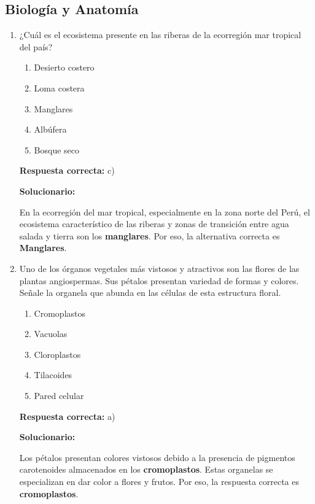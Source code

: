\subsection*{Biología y Anatomía}

\begin{enumerate}[resume]
	
	\item ¿Cuál es el ecosistema presente en las riberas de la ecorregión mar tropical del país?
	\begin{enumerate}[label=\alph*)]
		\item Desierto costero
		\item Loma costera
		\item Manglares
		\item Albúfera
		\item Bosque seco
	\end{enumerate}
	\textbf{Respuesta correcta:} c)
	
	\vspace{2mm}
	\textbf{Solucionario:}
	
	En la ecorregión del mar tropical, especialmente en la zona norte del Perú, el ecosistema característico de las riberas y zonas de transición entre agua salada y tierra son los \textbf{manglares}. Por eso, la alternativa correcta es \textbf{Manglares}.
	
	\vspace{6mm}
	
	\item Uno de los órganos vegetales más vistosos y atractivos son las flores de las plantas angiospermas. Sus pétalos presentan variedad de formas y colores. Señale la organela que abunda en las células de esta estructura floral.
	\begin{enumerate}[label=\alph*)]
		\item Cromoplastos
		\item Vacuolas
		\item Cloroplastos
		\item Tilacoides
		\item Pared celular
	\end{enumerate}
	\textbf{Respuesta correcta:} a)
	
	\vspace{2mm}
	\textbf{Solucionario:}
	
	Los pétalos presentan colores vistosos debido a la presencia de pigmentos carotenoides almacenados en los \textbf{cromoplastos}. Estas organelas se especializan en dar color a flores y frutos. Por eso, la respuesta correcta es \textbf{cromoplastos}.
	
	\vspace{6mm}
	
\end{enumerate}

